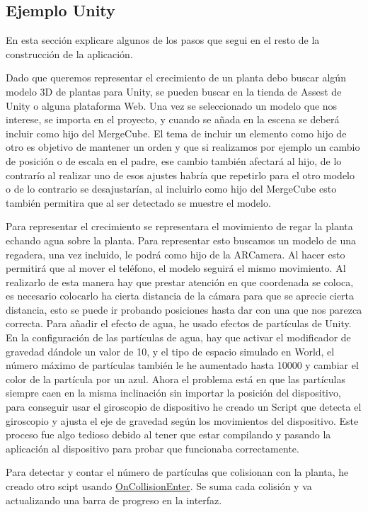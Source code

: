 \subsection{Ejemplo Unity}
En esta sección explicare algunos de los pasos que segui en el resto de la construcción de la aplicación.

Dado que queremos representar el crecimiento de un planta debo buscar algún modelo 3D de plantas para Unity, se pueden buscar en la tienda de Assest de Unity o alguna plataforma Web. Una vez se seleccionado un modelo que nos interese, se importa en el proyecto, y cuando se añada en la escena se deberá incluir como hijo del MergeCube. El tema de incluir un elemento como hijo de otro es objetivo de mantener un orden y que si realizamos por ejemplo un cambio de posición o de escala en el padre, ese cambio también afectará al hijo, de lo contrarío al realizar uno de esos ajustes habría que repetirlo para el otro modelo o de lo contrario se desajustarían, al incluirlo como hijo del MergeCube esto también permitira que al ser detectado se muestre el modelo.

Para representar el crecimiento se representara el movimiento de regar la planta echando agua sobre la planta. Para representar esto buscamos un modelo de una regadera, una vez incluido, le podrá como hijo de la ARCamera. Al hacer esto permitirá que al mover el teléfono, el modelo seguirá el mismo movimiento.
Al realizarlo de esta manera hay que prestar atención en que coordenada se coloca, es necesario colocarlo ha cierta distancia de la cámara para que se aprecie cierta distancia, esto se puede ir probando posiciones hasta dar con una que nos parezca correcta.
Para añadir el efecto de agua, he usado efectos de partículas de Unity. En la configuración de las partículas de agua, hay que activar el modificador de gravedad dándole un valor de 10, y el tipo de espacio simulado en World, el número máximo de partículas también le he aumentado hasta 10000 y cambiar el color de la partícula por un azul. Ahora el problema está en que las partículas siempre caen en la misma inclinación sin importar la posición del dispositivo, para conseguir usar el giroscopio de dispositivo he creado un Script que detecta el giroscopio y ajusta el eje de gravedad según los movimientos del dispositivo. Este proceso fue algo tedioso debido al tener que estar compilando y pasando la aplicación al dispositivo para probar que funcionaba correctamente.

Para detectar y contar el número de partículas que colisionan con la planta, he creado otro scipt usando \href{https://docs.unity3d.com/ScriptReference/Collider.OnCollisionEnter.html}{OnCollisionEnter}. Se suma cada colisión y va actualizando una barra de progreso en la interfaz.

